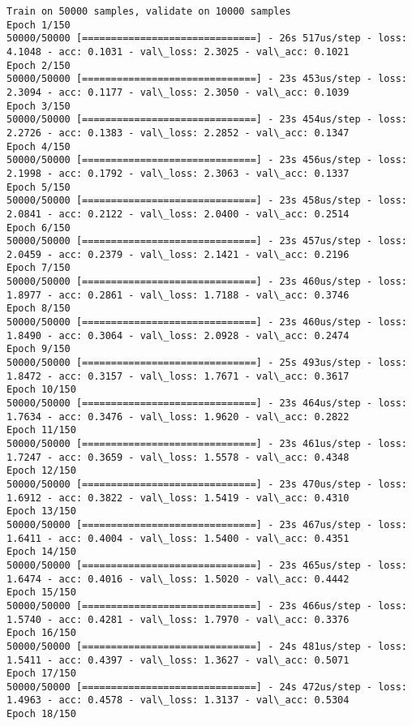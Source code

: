 \documentclass[11pt]{article}
\begin{document}
    \begin{Verbatim}[commandchars=\\\{\}]
Train on 50000 samples, validate on 10000 samples
Epoch 1/150
50000/50000 [==============================] - 26s 517us/step - loss: 4.1048 - acc: 0.1031 - val\_loss: 2.3025 - val\_acc: 0.1021
Epoch 2/150
50000/50000 [==============================] - 23s 453us/step - loss: 2.3094 - acc: 0.1177 - val\_loss: 2.3050 - val\_acc: 0.1039
Epoch 3/150
50000/50000 [==============================] - 23s 454us/step - loss: 2.2726 - acc: 0.1383 - val\_loss: 2.2852 - val\_acc: 0.1347
Epoch 4/150
50000/50000 [==============================] - 23s 456us/step - loss: 2.1998 - acc: 0.1792 - val\_loss: 2.3063 - val\_acc: 0.1337
Epoch 5/150
50000/50000 [==============================] - 23s 458us/step - loss: 2.0841 - acc: 0.2122 - val\_loss: 2.0400 - val\_acc: 0.2514
Epoch 6/150
50000/50000 [==============================] - 23s 457us/step - loss: 2.0459 - acc: 0.2379 - val\_loss: 2.1421 - val\_acc: 0.2196
Epoch 7/150
50000/50000 [==============================] - 23s 460us/step - loss: 1.8977 - acc: 0.2861 - val\_loss: 1.7188 - val\_acc: 0.3746
Epoch 8/150
50000/50000 [==============================] - 23s 460us/step - loss: 1.8490 - acc: 0.3064 - val\_loss: 2.0928 - val\_acc: 0.2474
Epoch 9/150
50000/50000 [==============================] - 25s 493us/step - loss: 1.8472 - acc: 0.3157 - val\_loss: 1.7671 - val\_acc: 0.3617
Epoch 10/150
50000/50000 [==============================] - 23s 464us/step - loss: 1.7634 - acc: 0.3476 - val\_loss: 1.9620 - val\_acc: 0.2822
Epoch 11/150
50000/50000 [==============================] - 23s 461us/step - loss: 1.7247 - acc: 0.3659 - val\_loss: 1.5578 - val\_acc: 0.4348
Epoch 12/150
50000/50000 [==============================] - 23s 470us/step - loss: 1.6912 - acc: 0.3822 - val\_loss: 1.5419 - val\_acc: 0.4310
Epoch 13/150
50000/50000 [==============================] - 23s 467us/step - loss: 1.6411 - acc: 0.4004 - val\_loss: 1.5400 - val\_acc: 0.4351
Epoch 14/150
50000/50000 [==============================] - 23s 465us/step - loss: 1.6474 - acc: 0.4016 - val\_loss: 1.5020 - val\_acc: 0.4442
Epoch 15/150
50000/50000 [==============================] - 23s 466us/step - loss: 1.5740 - acc: 0.4281 - val\_loss: 1.7970 - val\_acc: 0.3376
Epoch 16/150
50000/50000 [==============================] - 24s 481us/step - loss: 1.5411 - acc: 0.4397 - val\_loss: 1.3627 - val\_acc: 0.5071
Epoch 17/150
50000/50000 [==============================] - 24s 472us/step - loss: 1.4963 - acc: 0.4578 - val\_loss: 1.3137 - val\_acc: 0.5304
Epoch 18/150

\end{Verbatim}
\end{document}
